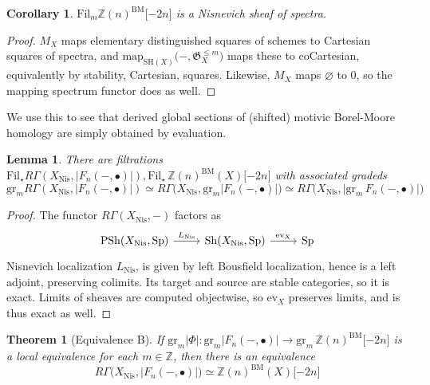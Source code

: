 \documentclass[11pt, twoside]{article}
\numberwithin{equation}{section}
\newtheorem{theorem}[equation]{Theorem}
\newtheorem{lemma}[equation]{Lemma}
\newtheorem{corollary}[equation]{Corollary}
\theoremstyle{definition}
\newcommand{\bb}[1]{\mathbb{#1}}
\newcommand{\mf}[1]{\mathfrak{#1}}
\newcommand{\map}{\mathrm{map}}
\newcommand{\fil}{\mathrm{Fil}}
\newcommand{\gr}{\mathrm{gr}}
\newcommand{\sh}{\mathrm{SH}}
\newcommand{\Sp}{\mathrm{Sp}}
\newcommand{\bm}{\mathrm{BM}}
\newcommand{\psh}{\mathrm{PSh}}
\newcommand{\shv}{\mathrm{Sh}}
\newcommand{\nis}{\mathrm{Nis}}
\begin{document}
\begin{corollary}\label{corr:loc-znbm}
\(\fil_m \bb{Z}(n)^\bm \lbrack -2n \rbrack\) is a Nisnevich sheaf of spectra.
\end{corollary}

\begin{proof}
\(M_X\) maps elementary distinguished squares of schemes to Cartesian squares of spectra, and \(\map_{\sh(X)}\big( -, \mf{G}_X^{\leq m}\big)\) maps these to coCartesian, equivalently by stability, Cartesian, squares. Likewise, \(M_X\) maps \(\varnothing\) to \(0\), so the mapping spectrum functor does as well.
\end{proof}

We use this to see that derived global sections of (shifted) motivic Borel-Moore homology are simply obtained by evaluation.

\begin{lemma}
There are filtrations \(\fil_\star R\Gamma(X_\nis, |F_n( -, \bullet)|), \fil_\star \, \bb{Z}(n)^\bm(X)\lbrack - 2n \rbrack\) with associated gradeds 
\[\gr_m R\Gamma(X_\nis, |F_n( -, \bullet)|) \simeq R\Gamma \big(X_\nis, \gr_m |F_n( -, \bullet)|\big) \simeq R\Gamma \big(X_\nis, \big|\gr_m \, F_n( -, \bullet)\big|\big)\]
\end{lemma}

\begin{proof}
The functor \(R\Gamma(X_\nis, -)\) factors as 
\[\begin{tikzcd}
\psh(X_\nis, \Sp) \ar[r, "L_\nis"] & \shv(X_\nis, \Sp) \ar[r, "\mathrm{ev}_X"] & \Sp
\end{tikzcd}\]
Nisnevich localization \(L_\nis\), is given by left Bousfield localization, hence is a left adjoint, preserving colimits. Its target and source are stable categories, so it is exact. Limits of sheaves are computed objectwise, so \(\mathrm{ev}_X\) preserves limits, and is thus exact as well.
\end{proof}


\begin{theorem}[Equivalence B]\label{thm:equiv-B}
If \(\gr_m |\Phi| \colon \gr_m |F_n( -, \bullet)| \to \gr_m \, \bb{Z}(n)^\bm \lbrack -2n \rbrack\) is a local equivalence for each \(m \in \bb{Z}\), then there is an equivalence 
\[R\Gamma \big(X_\nis, |F_n( -, \bullet)|\big) \simeq \bb{Z}(n)^\bm(X)\lbrack -2n \rbrack\]
\end{theorem}
\end{document}
